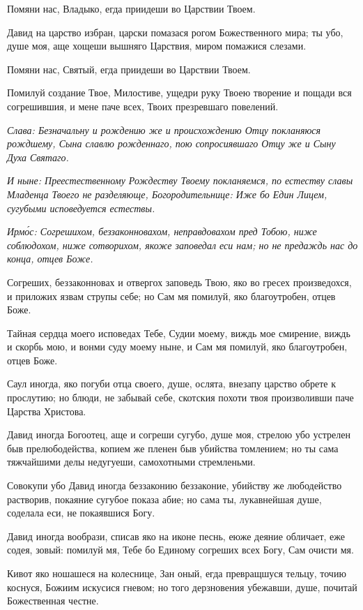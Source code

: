 Помяни нас, Владыко, егда приидеши во Царствии Твоем.

Давид на царство избран, царски помазася рогом Божественного мира; ты убо, душе моя, аще хощеши вышняго Царствия, миром помажися слезами.

Помяни нас, Святый, егда приидеши во Царствии Твоем.

Помилуй создание Твое, Милостиве, ущедри руку Твоею творение и пощади вся согрешившия, и мене паче всех, Твоих презревшаго повелений.

\itshape Слава\normalfont{}: Безначальну и рождению же и происхождению Отцу покланяюся рождшему, Сына славлю рожденнаго, пою сопросиявшаго Отцу же и Сыну Духа Святаго.

\itshape И ныне\normalfont{}: Преестественному Рождеству Твоему покланяемся, по естеству славы Младенца Твоего не разделяюще, Богородительнице: Иже бо Един Лицем, сугубыми исповедуется естествы. 


\itshape Ирм\'{о}с\normalfont{}: Согрешихом, беззаконновахом, неправдовахом пред Тобою, ниже соблюдохом, ниже сотворихом, якоже заповедал еси нам; но не предаждь нас до конца, отцев Боже.

Согреших, беззаконновах и отвергох заповедь Твою, яко во гресех произведохся, и приложих язвам струпы себе; но Сам мя помилуй, яко благоутробен, отцев Боже.

Тайная сердца моего исповедах Тебе, Судии моему, виждь мое смирение, виждь и скорбь мою, и вонми суду моему ныне, и Сам мя помилуй, яко благоутробен, отцев Боже.

Саул иногда, яко погуби отца своего, душе, ослята, внезапу царство обрете к прослутию; но блюди, не забывай себе, скотския похоти твоя произволивши паче Царства Христова.

Давид иногда Богоотец, аще и согреши сугубо, душе моя, стрелою убо устрелен быв прелюбодейства, копием же пленен быв убийства томлением; но ты сама тяжчайшими делы недугуеши, самохотными стремленьми.

Совокупи убо Давид иногда беззаконию беззаконие, убийству же любодейство растворив, покаяние сугубое показа абие; но сама ты, лукавнейшая душе, соделала еси, не покаявшися Богу.

Давид иногда вообрази, списав яко на иконе песнь, еюже деяние обличает, еже содея, зовый: помилуй мя, Тебе бо Единому согреших всех Богу, Сам очисти мя.

Кивот яко ношашеся на колеснице, Зан оный, егда превращшуся тельцу, точию коснуся, Божиим искусися гневом; но того дерзновения убежавши, душе, почитай Божественная честне.

